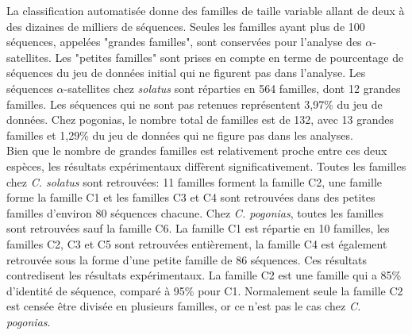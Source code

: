 \documentclass[12pt,a4paper]{article}
\begin{document}
			La classification automatisée donne des familles de taille variable allant de deux  à des dizaines de milliers de séquences. Seules les familles ayant plus de 100 séquences, appelées "grandes familles", sont conservées pour l'analyse des $\alpha$-satellites. Les "petites familles" sont prises en compte en terme de pourcentage de séquences du jeu de données initial qui ne figurent pas dans l'analyse. Les séquences $\alpha$-satellites chez \textit{solatus} sont réparties en 564 familles, dont 12 grandes familles. Les séquences qui ne sont pas retenues représentent 3,97\% du jeu de données. Chez pogonias, le nombre total de familles est de 132, avec 13 grandes familles et 1,29\% du jeu de données qui  ne figure pas dans les analyses.\\
			
			Bien que le nombre de grandes familles est relativement proche entre ces deux espèces, les résultats expérimentaux diffèrent significativement. Toutes les familles chez \textit{C. solatus} sont retrouvées: 11 familles forment la famille C2, une famille forme la famille C1 et les familles C3 et C4 sont retrouvées dans des petites familles d'environ 80 séquences chacune. Chez \textit{C. pogonias}, toutes les familles sont retrouvées sauf la famille C6. La famille C1 est répartie en 10 familles, les familles C2, C3 et C5 sont retrouvées entièrement, la famille C4 est également retrouvée sous la forme d'une petite famille de 86 séquences. Ces résultats contredisent les résultats expérimentaux. La famille C2 est une famille qui a 85\% d'identité de séquence, comparé à 95\% pour C1. Normalement seule la famille C2 est censée être divisée en plusieurs familles, or ce n'est pas le cas chez \textit{C. pogonias}.
			
\end{document}

